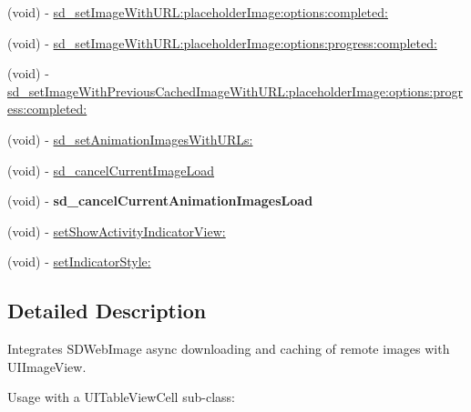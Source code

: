 \begin{DoxyCompactItemize}
(void) -\/ \mbox{\hyperlink{category_u_i_image_view_07_web_cache_08_ad2cf9154e98f4afdbba63251e3f1d1e5}{sd\+\_\+set\+Image\+With\+U\+R\+L\+:placeholder\+Image\+:options\+:completed\+:}}
\item 
(void) -\/ \mbox{\hyperlink{category_u_i_image_view_07_web_cache_08_a05de992a3162a51f223a248ceaa60856}{sd\+\_\+set\+Image\+With\+U\+R\+L\+:placeholder\+Image\+:options\+:progress\+:completed\+:}}
\item 
(void) -\/ \mbox{\hyperlink{category_u_i_image_view_07_web_cache_08_a80c34aa94dae003b0f2fd61ddf85becf}{sd\+\_\+set\+Image\+With\+Previous\+Cached\+Image\+With\+U\+R\+L\+:placeholder\+Image\+:options\+:progress\+:completed\+:}}
\item 
(void) -\/ \mbox{\hyperlink{category_u_i_image_view_07_web_cache_08_a3d9c6bf83abb348e4130429f2087b8af}{sd\+\_\+set\+Animation\+Images\+With\+U\+R\+Ls\+:}}
\item 
(void) -\/ \mbox{\hyperlink{category_u_i_image_view_07_web_cache_08_a5ff7ec2145bd69460982ea6bd3b6026e}{sd\+\_\+cancel\+Current\+Image\+Load}}
\item 
\mbox{\label{category_u_i_image_view_07_web_cache_08_a3342e1c1ee44e86559b07b39fafebac1}} 
(void) -\/ {\bfseries sd\+\_\+cancel\+Current\+Animation\+Images\+Load}
\item 
(void) -\/ \mbox{\hyperlink{category_u_i_image_view_07_web_cache_08_a9f8a8476a2e362282980bfd4fd4cdb1a}{set\+Show\+Activity\+Indicator\+View\+:}}
\item 
(void) -\/ \mbox{\hyperlink{category_u_i_image_view_07_web_cache_08_a951036cd5b2847b39b0e3a372423fa4e}{set\+Indicator\+Style\+:}}
\end{DoxyCompactItemize}


\subsection{Detailed Description}
Integrates S\+D\+Web\+Image async downloading and caching of remote images with U\+I\+Image\+View.

Usage with a U\+I\+Table\+View\+Cell sub-\/class\+:


